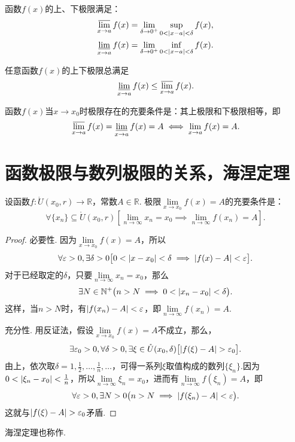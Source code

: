 \begin{property}
函数\(f(x)\)的上、下极限满足：\begin{gather}
\varlimsup\limits_{x \to a} f(x) = \lim\limits_{\delta\to0^+} \sup\limits_{0<\abs{x-a}<\delta} f(x), \\
\varliminf\limits_{x \to a} f(x) = \lim\limits_{\delta\to0^+} \inf\limits_{0<\abs{x-a}<\delta} f(x).
\end{gather}
\end{property}

\begin{theorem}
任意函数\(f(x)\)的上下极限总满足\[
\varliminf\limits_{x \to a} f(x) \leq \varlimsup\limits_{x \to a} f(x).
\]
\end{theorem}

\begin{theorem}
函数\(f(x)\)当\(x \to x_0\)时极限存在的充要条件是：其上极限和下极限相等，即\[
\varlimsup\limits_{x \to a} f(x) = \varliminf\limits_{x \to a} f(x) = A
\iff
\lim\limits_{x \to a} f(x) = A.
\]
\end{theorem}

\section{函数极限与数列极限的关系，海涅定理}
\begin{theorem}[海涅定理]\label{theorem:极限.海涅定理}
\def\Dx{\mathring{U}(x_0,r)}%
设函数\(f\colon \Dx\to\mathbb{R}\)，常数\(A\in\mathbb{R}\).
极限\(\lim\limits_{x \to x_0} f(x) = A\)的充要条件是：\[
\forall \{x_n\}\subseteq\Dx \left[
	\lim\limits_{n \to \infty} x_n = x_0
	\implies
	\lim\limits_{n \to \infty} f(x_n) = A
\right].
\]
\begin{proof}
必要性.
因为\(\lim\limits_{x \to x_0} f(x) = A\)，所以\[
\forall \varepsilon > 0, \exists \delta > 0 \bigl[
	0 < \abs{x - x_0} < \delta \implies \abs{f(x) - A} < \varepsilon
\bigr].
\]
对于已经取定的\(\delta\)，只要\(\lim\limits_{n \to \infty}x_n = x_0\)，那么\[
\exists N\in\mathbb{N}^+ \bigl(
	n > N \implies 0 < \abs{x_n - x_0} < \delta
\bigr).
\]这样，当\(n> N\)时，有\(\abs{f(x_n) - A} < \varepsilon\)，即\(\lim\limits_{n \to \infty} f(x_n) = A\).

充分性.
用反证法，假设\(\lim\limits_{x \to x_0} f(x) = A\)不成立，那么，\[
\exists \varepsilon_0 > 0, \forall \delta > 0, \exists \xi\in\mathring{U}(x_0,\delta) \bigl[
	\abs{f(\xi) - A} > \varepsilon_0
\bigr].
\]
由上，依次取\(\delta = 1,\frac{1}{2},\dotsc,\frac{1}{n},\dotsc\)，可得一系列\(\xi\)取值构成的数列\(\{\xi_n\}\).因为\(0 < \abs{\xi_n - x_0} < \frac{1}{n}\)，所以\(\lim\limits_{n \to \infty} \xi_n = x_0\)，进而有\(\lim\limits_{n \to \infty} f(\xi_n) = A\)，即\[
\forall \varepsilon > 0, \exists N > 0 \bigl(
	n > N \implies \abs{f(\xi_n) - A} < \varepsilon
\bigr).
\]这就与\(\abs{f(\xi) - A} > \varepsilon_0\)矛盾.
\end{proof}
\end{theorem}
海涅定理也称作.


